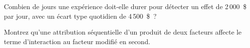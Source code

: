 \begin{interviewq}\label{iq:hf:pnl-analytics-and-the-strategy-lifecycle:5}
Combien de jours une expérience doit-elle durer pour détecter un effet de 2\,000~\$ par jour, avec un écart type quotidien de 4\,500~\$~?
\end{interviewq}

\begin{interviewq}\label{iq:hf:pnl-analytics-and-the-strategy-lifecycle:6}
Montrez qu'une attribution séquentielle d'un produit de deux facteurs affecte le terme d'interaction au facteur modifié en second.
\end{interviewq}
